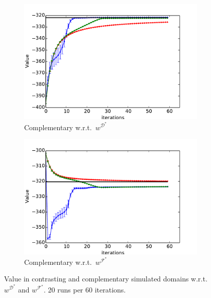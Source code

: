 \documentclass[letterpaper]{article}
\begin{document}
\begin{figure}[t]
\begin{subfigure}[b]{0.52\columnwidth}
    \includegraphics[trim=0.5cm 0.5cm 0.5cm 0,clip=true,width=\textwidth]{images/expert_apprentice_complementary.pdf}
    \caption{Complementary w.r.t.\ $w^{\mathcal{D}^*}$}
    \label{fig:toy_expert_apprentice_complementary}
  \end{subfigure}
  \hfill
  \begin{subfigure}[b]{0.52\columnwidth}
    \includegraphics[trim=0.5cm 0.5cm 0.5cm 0,clip=true,width=\textwidth]{images/taboo_apprentice_complementary.pdf}
    \caption{Complementary w.r.t.\ $w^{\mathcal{F}^*}$}
    \label{fig:toy_taboo_apprentice_complementary}
  \end{subfigure}  
  \vspace{-3mm}
  \caption{Value in contrasting and complementary simulated domains w.r.t. $w^{\mathcal{D}^*}$ and $w^{\mathcal{F}^*}$. 20 runs per 60 iterations.\ }
  \vspace{-5mm}
  \label{fig:complementary}
\end{figure}
\end{document}
